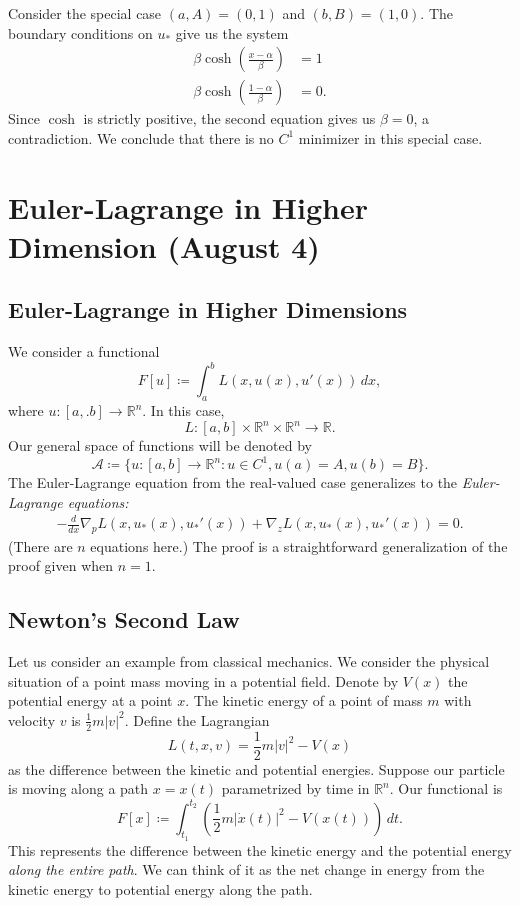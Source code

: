 \documentclass[11pt]{book}
\newcommand{\R}{\mathbb{R}}
\begin{document}
\begin{enumerate}
Consider the special case $(a,A) = (0, 1)$ and $(b, B) = (1,0)$. The boundary conditions on $u_*$ give us the system
\begin{align*}
\beta \cosh \left( \frac{x - \alpha}{\beta} \right) &= 1 \\
\beta \cosh\left( \frac{1 - \alpha}{\beta} \right) &= 0.
\end{align*}
Since $\cosh$ is strictly positive, the second equation gives us $\beta = 0$, a contradiction. We conclude that there is no $C^1$ minimizer in this special case.
\end{enumerate}

\newpage

\section{Euler-Lagrange in Higher Dimension (August 4)}

\subsection{Euler-Lagrange in Higher Dimensions}

We consider a functional
\[
F[u] \coloneqq \int_a^b L(x, u(x), u'(x)) \, dx,
\]
where $u : [a,.b] \to \R^n$. In this case,
\[
L : [a, b] \times \R^n \times \R^n \to \R.
\]
Our general space of functions will be denoted by 
\[
\mathcal{A} \coloneqq \{ u : [a,b] \to \R^n : u \in C^1, u(a) = A, u(b) = B \}.
\]
The Euler-Lagrange equation from the real-valued case generalizes to the \emph{Euler-Lagrange equations:}
\begin{align*}
-\frac{d}{dx} \nabla_p L(x, u_*(x), u_*'(x)) + \nabla_z L(x, u_*(x), u_*'(x)) = 0.
\end{align*}
(There are $n$ equations here.) The proof is a straightforward generalization of the proof given when $n = 1$.

\subsection{Newton's Second Law}

Let us consider an example from classical mechanics. We consider the physical situation of a point mass moving in a potential field. Denote by $V(x)$ the potential energy at a point $x$. The kinetic energy of a point of mass $m$ with velocity $v$ is $\frac{1}{2} m |v|^2$. Define the Lagrangian
\[
L(t,x,v) = \frac{1}{2} m |v|^2 - V(x)
\]
as the difference between the kinetic and potential energies. Suppose our particle is moving along a path $x = x(t)$ parametrized by time in $\R^n$. Our functional is
\[
F[x] \coloneqq \int_{t_1}^{t_2} \left( \frac{1}{2} m |\dot{x}(t)|^2 - V(x(t)) \right) \, dt.
\]
This represents the difference between the kinetic energy and the potential energy \emph{along the entire path}. We can think of it as the net change in energy from the kinetic energy to potential energy along the path.
\end{document}
